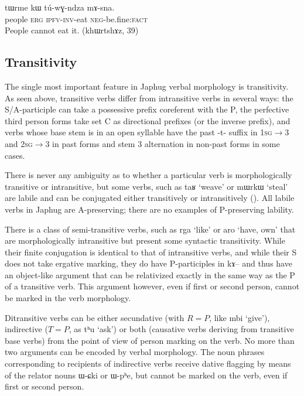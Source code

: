 \documentclass[oldfontcommands,oneside,a4paper,11pt]{article}
\newcommand{\ipa}[1]{{\phon #1}} %
\begin{document}
\begin{exe}
\ex \label{ex:tuwGndza.sna}
\gll
\ipa{tɯrme}  	\ipa{kɯ}  	\ipa{tú-wɣ-ndza}  	\ipa{mɤ-sna.}   \\
people \textsc{erg} \textsc{ipfv-inv}-eat \textsc{neg-}be.fine:\textsc{fact} \\
\glt People cannot eat it. (\ipa{khɯrtshɤz}, 39)
\end{exe}

\subsection{Transitivity}
The single most important feature in Japhug verbal morphology is transitivity. As seen above, transitive verbs differ from intransitive verbs in several ways: the S/A-participle can take a possessive prefix coreferent with the P, the perfective third person forms take set C as directional prefixes (or the inverse prefix), and verbs whose base stem is in an open syllable have the past \ipa{-t-} suffix in \textsc{1sg$\rightarrow$3} and \textsc{2sg$\rightarrow$3} in past forms and stem 3 alternation in non-past forms in some cases.

There is never any ambiguity as to whether a particular verb is morphologically  transitive or intransitive, but some verbs, such as \ipa{taʁ} `weave' or \ipa{mɯrkɯ} `steal' are labile and can be conjugated either transitively or intransitively (\citealt{jacques12demotion}). All labile verbs in Japhug are A-preserving; there are no examples of P-preserving lability.

There is a class of semi-transitive verbs, such as \ipa{rga} `like' or \ipa{aro} `have, own' that are morphologically intransitive but present some syntactic transitivity. While their finite conjugation is identical to that of intransitive verbs, and while their S does not take ergative marking, they do have P-participles in \ipa{kɤ--} and thus have an object-like argument that can be relativized exactly in the same way as the P of a transitive verb. This argument however, even if first or second person, cannot be marked in the verb morphology.

Ditransitive verbs can be either secundative (with $R=P$, like \ipa{mbi} `give'), indirective ($T=P$, as \ipa{tʰu} `ask') or both (causative verbs deriving from transitive base verbs) from the point of view of person marking on the verb. No more than two arguments can be encoded by verbal morphology. The noun phrases corresponding to recipients of indirective verbs receive dative flagging by means of the relator nouns \ipa{ɯ-ɕki} or \ipa{ɯ-pʰe}, but cannot be marked on the verb, even if first or second person.
\end{document}
